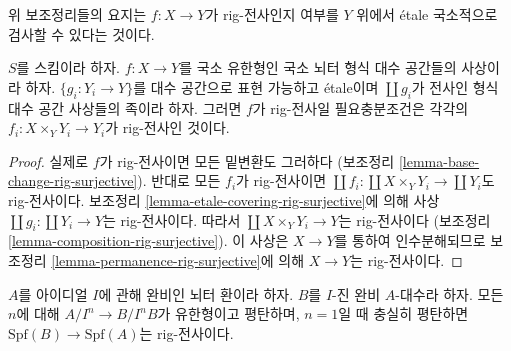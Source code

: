 \noindent
위 보조정리들의 요지는 $f : X \to Y$가 rig-전사인지 여부를
$Y$ 위에서 \'etale 국소적으로 검사할 수 있다는 것이다.

\begin{lemma}
\label{lemma-upshot}
$S$를 스킴이라 하자. $f : X \to Y$를 국소 유한형인 국소 뇌터
형식 대수 공간들의 사상이라 하자. $\{g_i : Y_i \to Y\}$를 대수 공간으로
표현 가능하고 \'etale이며 $\coprod g_i$가 전사인 형식 대수 공간 사상들의
족이라 하자. 그러면 $f$가 rig-전사일 필요충분조건은 각각의
$f_i : X \times_Y Y_i \to Y_i$가 rig-전사인 것이다.
\end{lemma}

\begin{proof}
실제로 $f$가 rig-전사이면 모든 밑변환도 그러하다
(보조정리 \ref{lemma-base-change-rig-surjective}). 반대로 모든 $f_i$가
rig-전사이면 $\coprod f_i : \coprod X \times_Y Y_i \to \coprod Y_i$도
rig-전사이다. 보조정리 \ref{lemma-etale-covering-rig-surjective}에 의해 사상
$\coprod g_i : \coprod Y_i \to Y$는 rig-전사이다. 따라서
$\coprod X \times_Y Y_i \to Y$는 rig-전사이다
(보조정리 \ref{lemma-composition-rig-surjective}). 이 사상은
$X \to Y$를 통하여 인수분해되므로 보조정리
\ref{lemma-permanence-rig-surjective}에 의해 $X \to Y$는 rig-전사이다.
\end{proof}

\begin{lemma}
\label{lemma-faithfully-flat-rig-surjective}
$A$를 아이디얼 $I$에 관해 완비인 뇌터 환이라 하자.
$B$를 $I$-진 완비 $A$-대수라 하자. 모든 $n$에 대해
$A/I^n \to B/I^nB$가 유한형이고 평탄하며, $n = 1$일 때 충실히 평탄하면
$\text{Spf}(B) \to \text{Spf}(A)$는 rig-전사이다.
\end{lemma}

